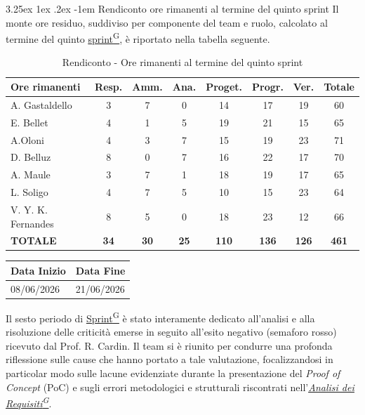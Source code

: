 \documentclass[a4paper,12pt]{article}
\makeatletter
\newcounter{subsubsubsection}[subsubsection]
\renewcommand\paragraph{\@startsection{paragraph}{5}{\z@}%
  {3.25ex \@plus1ex \@minus.2ex}%
  {-1em}%
  {\normalfont\normalsize\bfseries}}
\providecommand{\glslink}[2]{\href{https://alittlebyte-19.github.io/Documentazione/glossario.html\#gls-#1}{\underline{#2}\textsuperscript{\scriptsize G}}}
\makeatother
\begin{document}
\paragraph{Rendiconto ore rimanenti al termine del quinto sprint}
Il monte ore residuo, suddiviso per componente del team e ruolo, calcolato al termine del quinto \glslink{sprint}{sprint}, è riportato nella tabella seguente.
\begin{table}[htbp]
\centering
\renewcommand{\arraystretch}{1.5} 
\begin{tabularx}{\textwidth}{|X|c|c|c|c|c|c|c|}
\hline
\textbf{Ore rimanenti} & \textbf{Resp.} & \textbf{Amm.} & \textbf{Ana.} & \textbf{Proget.} & \textbf{Progr.} & \textbf{Ver.} & \textbf{Totale} \\
\hline
A. Gastaldello & 3 & 7 & 0 & 14 & 17 & 19 & 60 \\
\hline
E. Bellet & 4 & 1 & 5 & 19 & 21 & 15 & 65 \\
\hline
A.Oloni & 4 & 3 & 7 & 15 & 19 & 23 & 71 \\
\hline
D. Belluz & 8 & 0 & 7 & 16 & 22 & 17 & 70 \\
\hline
A. Maule & 3 & 7 & 1 & 18 & 19 & 17 & 65 \\
\hline
L. Soligo & 4 & 7 & 5 & 10 & 15 & 23 & 64 \\
\hline
V. Y. K. Fernandes & 8 & 5 & 0 & 18 & 23 & 12 & 66 \\
\hline
\rowcolor{gray!20}
\textbf{TOTALE} & \textbf{34} & \textbf{30} & \textbf{25} & \textbf{110} & \textbf{136} & \textbf{126} & \textbf{461} \\
\hline
\end{tabularx}
\caption{Rendiconto - Ore rimanenti al termine del quinto sprint}
\end{table}


\newpage


\label{sec:rtb_sestoperiodo}
\begin{table}[H]
    \centering
    \renewcommand{\arraystretch}{1.5} 
    \begin{tabularx}{\textwidth}{|X|X|}
    \hline \rowcolor{Dandelion!50}
    \textbf{Data Inizio} & \textbf{Data Fine}\\
    \hline
    08/06/2026 & 21/06/2026\\
    \hline

    \end{tabularx}
\end{table}

Il sesto periodo di \glslink{sprint}{Sprint} è stato interamente dedicato all'analisi e alla risoluzione delle criticità emerse in seguito all'esito negativo (semaforo rosso) ricevuto dal Prof. R. Cardin. Il team si è riunito per condurre una profonda riflessione sulle cause che hanno portato a tale valutazione, focalizzandosi in particolar modo sulle lacune evidenziate durante la presentazione del \textit{Proof of Concept} (PoC) e sugli errori metodologici e strutturali riscontrati nell'\textit{\glslink{analisi-dei-requisiti-adr}{Analisi dei Requisiti}}.
\end{document}
